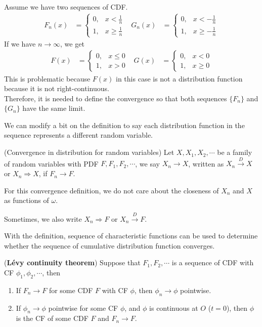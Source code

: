 \documentclass{huhtakm-template-book}
\begin{document}
\begin{eg}
	Assume we have two sequences of CDF.
	\begin{align*}
		F_{n}(x)&=\begin{cases}
			0, &x<\frac{1}{n}\\
			1, & x\geq\frac{1}{n}
		\end{cases} & G_{n}(x)&=\begin{cases}
			0, &x<-\frac{1}{n}\\
			1, & x\geq-\frac{1}{n}
		\end{cases}
	\end{align*}
	If we have $n\to\infty$, we get
	\begin{align*}
		F(x)&=\begin{cases}
			0, &x\leq 0\\
			1, &x>0
		\end{cases} & G(x)&=\begin{cases}
			0, &x<0\\
			1, &x\geq 0
		\end{cases}
	\end{align*}
	This is problematic because $F(x)$ in this case is not a distribution function because it is not right-continuous.\\
	Therefore, it is needed to define the convergence so that both sequences $\{F_{n}\}$ and $\{G_{n}\}$ have the same limit.
\end{eg}
We can modify a bit on the definition to say each distribution function in the sequence represents a different random variable.
\begin{defn}(Convergence in distribution for random variables)
	Let $X,X_{1},X_{2},\cdots$ be a family of random variables with PDF $F,F_{1},F_{2},\cdots$, we say $X_{n}\to X$, written as $X_{n}\xrightarrow{D}X$ or $X_{n}\Rightarrow X$, if $F_{n}\to F$.
\end{defn}
\begin{rem}
	For this convergence definition, we do not care about the closeness of $X_{n}$ and $X$ as functions of $\omega$.
\end{rem}
\begin{rem}
	Sometimes, we also write $X_{n}\Rightarrow F$ or $X_{n}\xrightarrow{D}F$.
\end{rem}
With the definition, sequence of characteristic functions can be used to determine whether the sequence of cumulative distribution function converges.
\begin{thm}(\textbf{L\'evy continuity theorem})
	\label{Chapter 5 Theorem Levy continuity theorem}
	Suppose that $F_{1},F_{2},\cdots$ is a sequence of CDF with CF $\phi_{1},\phi_{2},\cdots$, then
	\begin{enumerate}
		\item If $F_{n}\to F$ for some CDF $F$ with CF $\phi$, then $\phi_{n}\to\phi$ pointwise.
		\item If $\phi_{n}\to\phi$ pointwise for some CF $\phi$, and $\phi$ is continuous at $O$ ($t=0$), then $\phi$ is the CF of some CDF $F$ and $F_{n}\to F$.
	\end{enumerate}
\end{thm}
\end{document}

